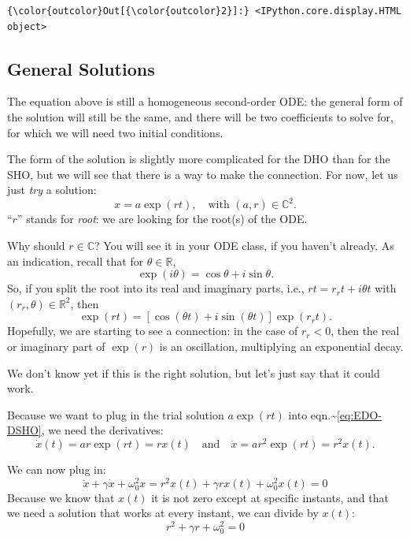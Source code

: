 \documentclass[11pt]{article}
\begin{document}
\begin{Verbatim}[commandchars=\\\{\}]
{\color{outcolor}Out[{\color{outcolor}2}]:} <IPython.core.display.HTML object>
\end{Verbatim}
            
    \hypertarget{general-solutions}{%
\subsection{General Solutions}\label{general-solutions}}

    The equation above is still a homogeneous second-order ODE: the general
form of the solution will still be the same, and there will be two
coefficients to solve for, for which we will need two initial
conditions.

The form of the solution is slightly more complicated for the DHO than
for the SHO, but we will see that there is a way to make the connection.
For now, let us just \emph{try} a solution:
\[x = a\exp(rt),\quad \textrm{with } (a, r) \in \mathbb C^2.\] ``\(r\)''
stands for \emph{root}: we are looking for the root(s) of the ODE.

Why should \(r\in\mathbb C\)? You will see it in your ODE class, if you
haven't already. As an indication, recall that for
\(\theta \in \mathbb R\), \[\exp(i\theta) = \cos\theta + i\sin\theta.\]
So, if you split the root into its real and imaginary parts, i.e.,
\(rt = r_r t + i\theta t\) with \((r_r, \theta) \in \mathbb R^2\), then
\[\exp(r t) = \left[\cos(\theta t) + i \sin(\theta t)\right]\exp(r_r t).\]
Hopefully, we are starting to see a connection: in the case of
\(r_r < 0\), then the real or imaginary part of \(\exp(r)\) is an
oscillation, multiplying an exponential decay.

We don't know yet if this is the right solution, but let's just say that
it could work.

    Because we want to plug in the trial solution \(a\exp(rt)\) into
eqn.\textasciitilde{}\eqref{eq:EDO-DSHO}, we need the derivatives:
\[ \dot x(t) = ar\exp(rt) = rx(t) \quad\textrm{and}\quad \ddot x = ar^2\exp(rt) = r^2x(t). \]

    We can now plug in:
\[ \ddot x + \gamma \dot x + \omega_0^2 x = r^2 x(t) + \gamma r x(t) + \omega_0^2 x(t) =  0\]
Because we know that \(x(t)\) it is not zero except at specific
instants, and that we need a solution that works at every instant, we
can divide by \(x(t)\): \begin{equation}
    r^2 + \gamma r + \omega_0^2 = 0
\end{equation}
\end{document}
